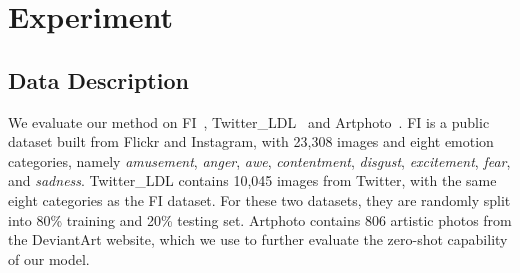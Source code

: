 \section{Experiment}
\label{s:experiment}

\subsection{Data Description}
We evaluate our method on FI~\cite{you2016building}, Twitter\_LDL~\cite{yang2017learning} and Artphoto~\cite{machajdik2010affective}.
FI is a public dataset built from Flickr and Instagram, with 23,308 images and eight emotion categories, namely \textit{amusement}, \textit{anger}, \textit{awe},  \textit{contentment}, \textit{disgust}, \textit{excitement},  \textit{fear}, and \textit{sadness}. 
Twitter\_LDL contains 10,045 images from Twitter, with the same eight categories as the FI dataset.
For these two datasets, they are randomly split into 80\%
training and 20\% testing set.
Artphoto contains 806 artistic photos from the DeviantArt website, which we use to further evaluate the zero-shot capability of our model.



